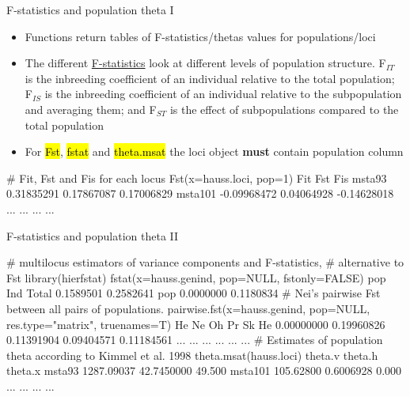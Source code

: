 \documentclass[compress, ucs, xelatex, 11pt, xcolor=svgnames,
  hyperref={
    bookmarks=true,
    unicode=true,
    colorlinks=true,
    pdftitle={Molecular data in R},
    plainpages=false,
    pdfauthor={Vojtech Zeisek},
    pdfsubject={Course about phylogeny and evolution in R},
    pdfcreator={XeLaTeX},
    pdfkeywords={R, evolution, phylogeny, molecular data},
    linkcolor=Tomato,
    anchorcolor=SaddleBrown,
    citecolor=Goldenrod,
    filecolor=DarkMagenta,
    menucolor=Sienna,
    urlcolor=DarkTurquoise,
    pdftex},
  url={hyphens, lowtilde} %
  ]{beamer}
\renewcommand{\texttt}[1]{\hl{\ttfamily #1}}
\begin{document}
\begin{frame}[fragile]{F-statistics and population theta I}
  \begin{itemize}
    \item Functions return tables of F-statistics/thetas values for populations/loci
    \item The different \href{https://en.wikipedia.org/wiki/F-statistics}{F-statistics} look at different levels of population structure. F$_{IT}$ is the inbreeding coefficient of an individual relative to the total population; F$_{IS}$ is the inbreeding coefficient of an individual relative to the subpopulation and averaging them; and F$_{ST}$ is the effect of subpopulations compared to the total population
    \item For \texttt{Fst}, \texttt{fstat} and \texttt{theta.msat} the loci object \textbf{must} contain population column
  \end{itemize}
  \begin{spluscode}
    # Fit, Fst and Fis for each locus
    Fst(x=hauss.loci, pop=1)
                    Fit        Fst         Fis
    msta93   0.31835291 0.17867087  0.17006829
    msta101 -0.09968472 0.04064928 -0.14628018
        ...         ...        ...         ...
  \end{spluscode}
\end{frame}

\begin{frame}[fragile]{F-statistics and population theta II}
  \begin{spluscode}
    # multilocus estimators of variance components and F-statistics,
    # alternative to Fst
    library(hierfstat)
    fstat(x=hauss.genind, pop=NULL, fstonly=FALSE)
                pop       Ind
    Total 0.1589501 0.2582641
    pop   0.0000000 0.1180834
    # Nei's pairwise Fst between all pairs of populations.
    pairwise.fst(x=hauss.genind, pop=NULL, res.type="matrix", truenames=T)
               He         Ne         Oh         Pr         Sk
    He 0.00000000 0.19960826 0.11391904 0.09404571 0.11184561
    ...       ...        ...        ...        ...        ...
    # Estimates of population theta according to Kimmel et al. 1998
    theta.msat(hauss.loci)
               theta.v    theta.h theta.x
    msta93  1287.09037 42.7450000  49.500
    msta101  105.62800  0.6006928   0.000
        ...        ...        ...     ...
  \end{spluscode}
\end{frame}
\end{document}
